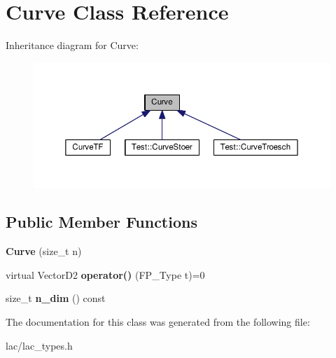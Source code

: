 \hypertarget{classCurve}{}\section{Curve Class Reference}
\label{classCurve}


Inheritance diagram for Curve\+:\nopagebreak
\begin{figure}[H]
\begin{center}
\leavevmode
\includegraphics[width=350pt]{classCurve__inherit__graph}
\end{center}
\end{figure}
\subsection*{Public Member Functions}
\begin{DoxyCompactItemize}
\item 
\mbox{\label{classCurve_a22b14ea68bfea761cdfc82b197e95dfb}} 
{\bfseries Curve} (size\+\_\+t n)
\item 
\mbox{\label{classCurve_a474b9f54f114e203a285801eefff70e8}} 
virtual Vector\+D2 {\bfseries operator()} (F\+P\+\_\+\+Type t)=0
\item 
\mbox{\label{classCurve_a8b0420ec4d2c625b61be7c601f54f3ce}} 
size\+\_\+t {\bfseries n\+\_\+dim} () const
\end{DoxyCompactItemize}


The documentation for this class was generated from the following file\+:\begin{DoxyCompactItemize}
\item 
lac/lac\+\_\+types.\+h\end{DoxyCompactItemize}
